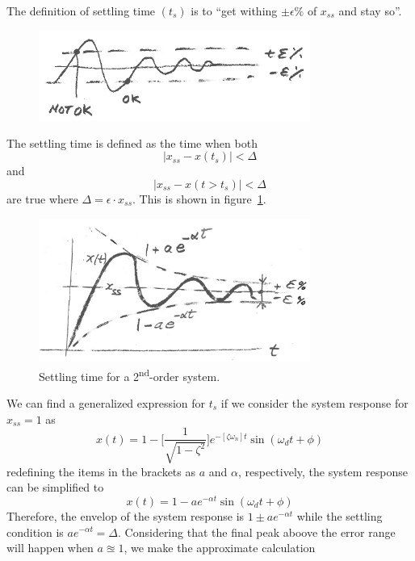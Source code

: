 \documentclass[12pt,letter]{article}
\begin{document}
The definition of settling time $(t_s)$ is to ``get withing $\pm \epsilon \%$ of $x_{ss}$ and stay so''. 
\begin{figure}[H]
	\centering
	\includegraphics[width=3.5in]{../figures/2nd_order_settling_time_definition.png}
\end{figure}
\noindent The settling time is defined as the time when both 
\begin{equation}
|x_{ss} - x(t_s)| < \Delta
\end{equation}
and
\begin{equation}
|x_{ss} - x(t > t_s)| < \Delta
\end{equation}
are true where $\Delta = \epsilon \cdot x_{ss}$. This is shown in figure~\ref{fig:2nd_order_settling_time}.
\begin{figure}[H]
	\centering
	\includegraphics[width=3.5in]{../figures/2nd_order_settling_time.png}
	\caption{Settling time for a 2\textsuperscript{nd}-order system.}
	\label{fig:2nd_order_settling_time}
\end{figure}
\noindent We can find a generalized expression for $t_s$ if we consider the system response for $x_{ss} = 1$ as
\begin{equation}
x(t) = 1 - \bigg[\frac{1}{\sqrt{1-\zeta^2}} \bigg] e^{-[\zeta \omega_n] t} \sin(\omega_d t+ \phi)
\end{equation}
redefining the items in the brackets as $a$ and $\alpha$, respectively, the system response can be simplified to
\begin{equation}
x(t) = 1 - a e^{-\alpha t} \sin(\omega_d t+ \phi)
\end{equation}
Therefore, the envelop of the system response is $1\pm a e^{- \alpha t}$ while the settling condition is $a e^{- \alpha t} = \Delta$. Considering that the final peak aboove the error range will happen when $a \approxeq 1$, we make the approximate calculation
\end{document}
